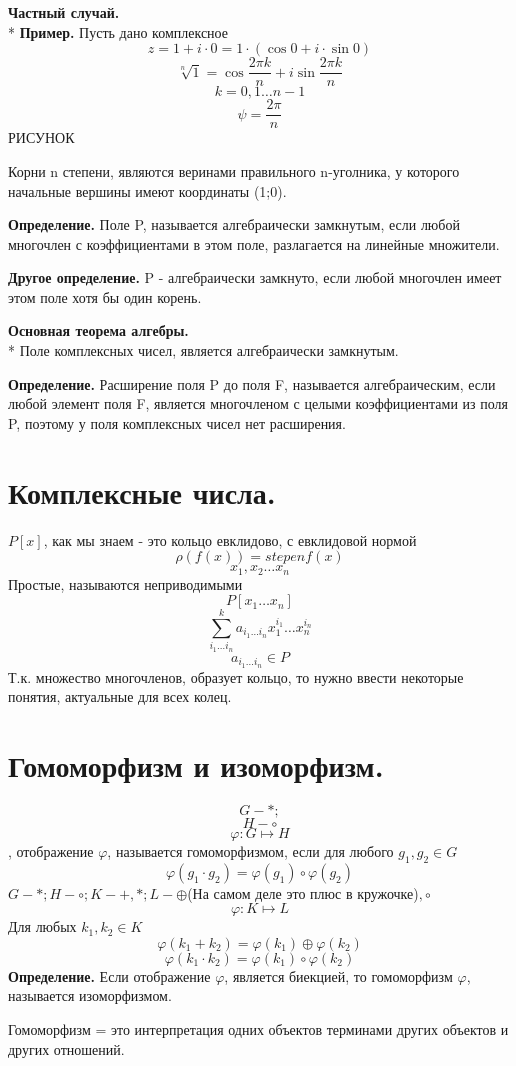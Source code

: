 \documentclass{article}
\begin{document}
{\bf Частный случай.}\\*
{\bf Пример.} Пусть дано комплексное $$z=1+i\cdot 0=1\cdot(\cos0+i\cdot\sin0)$$
$$\sqrt[n]{1}=\cos\frac{2\pi k}{n}+i\sin\frac{2\pi k}{n}$$
$$k=0,1\ldots n-1$$
$$\psi=\frac{2\pi}{n}$$
РИСУНОК

Корни n степени, являются веринами правильного n-уголника, у которого начальные вершины имеют координаты (1;0).

{\bf Определение.} Поле P, называется алгебраически замкнутым, если любой многочлен с коэффициентами в этом поле, разлагается на линейные множители.

{\bf Другое определение.} P - алгебраически замкнуто, если любой многочлен имеет  этом поле хотя бы один корень.

{\bf Основная теорема алгебры.}\\*
Поле комплексных чисел, является алгебраически замкнутым.

{\bf Определение.} Расширение поля P до поля F, называется алгебраическим, если любой элемент поля F, является многочленом с целыми коэффициентами из поля P, поэтому у поля комплексных чисел нет расширения.
\section*{Комплексные числа.} 
$P[x]$, как мы знаем - это кольцо евклидово, с евклидовой нормой $$\rho(f(x))=stepenf(x)$$
$$x_1,x_2\ldots x_n$$
Простые, называются неприводимыми $$P[x_1\ldots x_n]$$
$$\sum_{i_1\ldots i_n}^k a_{i_1\ldots i_n}x^{i_1}_1\ldots x^{i_n}_n$$
$$a_{i_1\ldots i_n}\in P$$
Т.к. множество многочленов, образует кольцо, то нужно ввести некоторые понятия, актуальные для всех колец.

\section*{Гомоморфизм и изоморфизм.} $$G - *;$$ $$H - \circ$$
$$\varphi:G\mapsto H$$, отображение $\varphi$, называется гомоморфизмом, если для любого $g_1,g_2\in G$ $$\varphi(g_1\cdot g_2)=\varphi(g_1)\circ\varphi(g_2)$$
$G - *; H - \circ; K - +,*; L - \oplus$(На самом деле это плюс в кружочке)$,\circ$ 
$$\varphi:K\mapsto L$$
Для любых $k_1,k_2\in K$
$$\varphi(k_1+k_2)=\varphi(k_1)\oplus\varphi(k_2)$$
$$\varphi(k_1\cdot k_2)=\varphi(k_1)\circ\varphi(k_2)$$
{\bf Определение.} Если отображение $\varphi$, является биекцией, то гомоморфизм $\varphi$, называется изоморфизмом.

Гомоморфизм = это интерпретация одних объектов терминами других объектов и других отношений.
\end{document}
